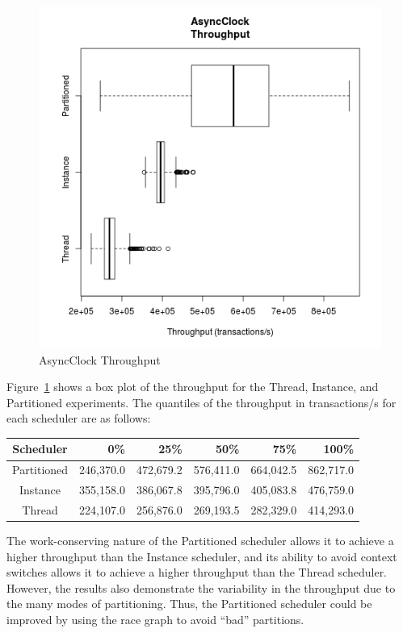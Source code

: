 \begin{figure}[H]
\center
\includegraphics[height=.4\textheight]{async_throughput_box.png}
\caption{AsyncClock Throughput}
\label{async_throughput_box}
\end{figure}

Figure~\ref{async_throughput_box} shows a box plot of the throughput for the Thread, Instance, and Partitioned experiments.
The quantiles of the throughput in transactions/s for each scheduler are as follows:
\begin{center}
\begin{tabular}{crrrrr}
Scheduler   &       0\%   &    25\%     &    50\%     &    75\%     &   100\% \\
\hline
Partitioned &   246,370.0 &   472,679.2 &   576,411.0 &   664,042.5 &    862,717.0 \\
Instance    &   355,158.0 &   386,067.8 &   395,796.0 &   405,083.8 &    476,759.0 \\
Thread      &   224,107.0 &   256,876.0 &   269,193.5 &   282,329.0 &    414,293.0 \\
\end{tabular}
\end{center}
The work-conserving nature of the Partitioned scheduler allows it to achieve a higher throughput than the Instance scheduler, and its ability to avoid context switches allows it to achieve a higher throughput than the Thread scheduler.
However, the results also demonstrate the variability in the throughput due to the many modes of partitioning.
Thus, the Partitioned scheduler could be improved by using the race graph to avoid ``bad'' partitions.

